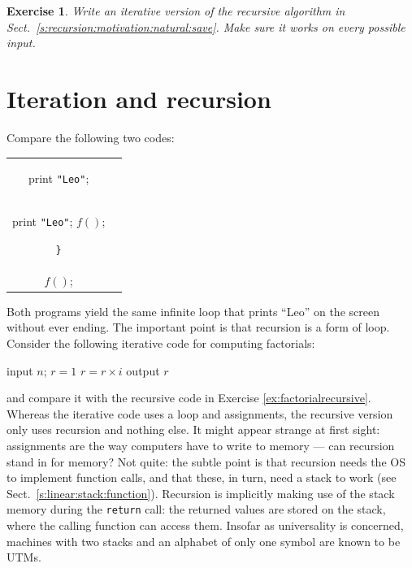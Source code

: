 \documentclass[a4paper]{book}
\theoremstyle{changebreak}                %
\newtheorem{ex}[result]{Exercise}
\begin{document}
\begin{ex}
Write an iterative version of the recursive algorithm in
Sect.~\ref{s:recursion:motivation:natural:save}. Make sure it works on
every possible input.
\end{ex}

\section{Iteration and recursion}
Compare the following two codes:
\begin{center}
\begin{tabular}{|c|c|}\hline
\begin{minipage}{6cm}
\begin{algorithmic}
\WHILE{({\tt true})}
  \STATE print {\tt "Leo"};
\ENDWHILE
\end{algorithmic}
\end{minipage}
&
\begin{minipage}{6cm}
\vspace*{0.5em}
{\bf function} $f()$ {\tt \{} \\ [-1.2em]
\begin{algorithmic}
\STATE print {\tt "Leo"};
\STATE $f()$;
\end{algorithmic}
{\tt \}} \\ [0.3em] 
$f()$;
\par
\vspace*{0.5em}
\end{minipage} \\ \hline
\end{tabular}
\end{center}
Both programs yield the same infinite loop that
prints ``Leo'' on the screen without ever ending. The important point
is that recursion is a form of loop. Consider the following iterative
code for computing factorials:
\begin{algorithmic}
\STATE input $n$;
\STATE $r=1$
  \STATE $r=r\times i$
\ENDFOR
\STATE output $r$
\end{algorithmic}
and compare it with the recursive code in Exercise
\ref{ex:factorialrecursive}. Whereas the iterative code uses a loop
and assignments, the recursive version only uses
recursion and nothing else. It might appear strange at first sight:
assignments are the way computers have to write to
memory --- can recursion stand in for memory? Not quite:
the subtle point is that recursion needs the OS to implement
function calls, and that these, in turn, need a
stack to work (see Sect.~\ref{s:linear:stack:function}). Recursion is
implicitly making use of the stack memory during the {\tt return}
call: the returned values are stored on the stack, where the calling
function can access them. Insofar as universality
is concerned, machines with two stacks and an
alphabet of only one symbol are known to be
UTMs.
\end{document}
